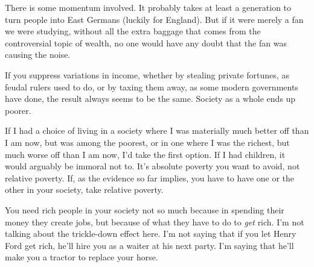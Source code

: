 There is some momentum involved. It probably takes at least a generation
to turn people into East Germans (luckily for England). But if it were
merely a fan we were studying, without all the extra baggage that comes
from the controversial topic of wealth, no one would have any doubt that
the fan was causing the noise.

If you suppress variations in income, whether by stealing private
fortunes, as feudal rulers used to do, or by taxing them away, as some
modern governments have done, the result always seems to be the same.
Society as a whole ends up poorer.

If I had a choice of living in a society where I was materially much
better off than I am now, but was among the poorest, or in one where I
was the richest, but much worse off than I am now, I'd take the first
option. If I had children, it would arguably be immoral not to. It's
absolute poverty you want to avoid, not relative poverty. If, as the
evidence so far implies, you have to have one or the other in your
society, take relative poverty.

You need rich people in your society not so much because in spending
their money they create jobs, but because of what they have to do to
\emph{get} rich. I'm not talking about the trickle-down effect here. I'm
not saying that if you let Henry Ford get rich, he'll hire you as a
waiter at his next party. I'm saying that he'll make you a tractor to
replace your horse.